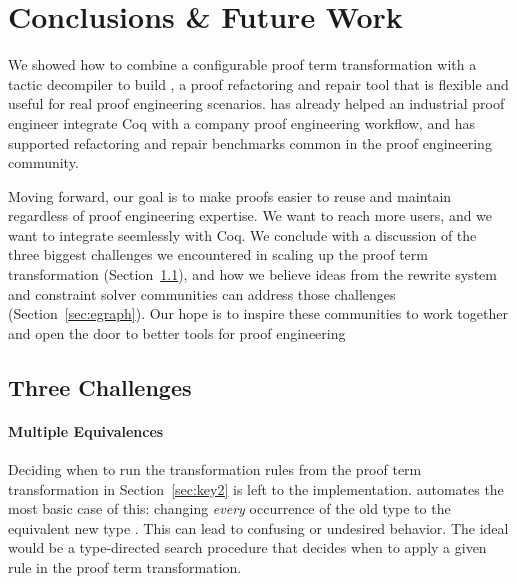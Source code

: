 \section{Conclusions \& Future Work}
\label{sec:discussion}

We showed how to combine a configurable proof term transformation with a tactic decompiler to build \toolname,
a proof refactoring and repair tool that is flexible and useful for real proof engineering scenarios.
\toolname has already helped an industrial proof engineer integrate Coq with a company proof engineering workflow,
and has supported refactoring and repair benchmarks common in the proof engineering community.

Moving forward, our goal is to make proofs easier to reuse and maintain regardless of proof engineering expertise.
We want to reach more users, and we want \toolname to integrate seemlessly with Coq.
We conclude with a discussion of the three biggest challenges we encountered in scaling up the \toolname proof term 
transformation (Section~\ref{sec:problems}), and how we believe ideas from the rewrite system and constraint
solver communities can address those challenges (Section~\ref{sec:egraph}).
Our hope is to inspire these communities to work together and open the door to better tools for proof engineering

\subsection{Three Challenges}
\label{sec:problems}

\paragraph{Multiple Equivalences}

Deciding when to run the transformation rules from the proof term transformation in Section~\ref{sec:key2} is left to the implementation.
\toolname automates the most basic case of this: changing \textit{every} occurrence of the old type \A to the equivalent new type \B.
This can lead to confusing or undesired behavior.
The ideal would be a type-directed search procedure that decides when to apply a given rule in the proof term transformation.

